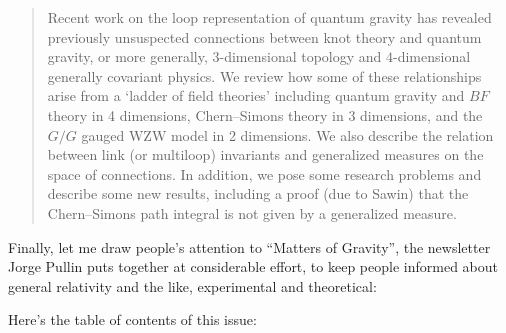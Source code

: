 \documentclass[12pt]{article}
\def\tightlist{}
\renewcommand{\texttt}[1]{%
  \begingroup
  \ttfamily
  \begingroup\lccode`~=`/\lowercase{\endgroup\def~}{/\discretionary{}{}{}}%
  \begingroup\lccode`~=`[\lowercase{\endgroup\def~}{[\discretionary{}{}{}}%
  \begingroup\lccode`~=`.\lowercase{\endgroup\def~}{.\discretionary{}{}{}}%
  \catcode`/=\active\catcode`[=\active\catcode`.=\active
  \scantokens{#1\noexpand}%
  \endgroup
}
\begin{document}
\begin{quote}
Recent work on the loop representation of quantum gravity has revealed
previously unsuspected connections between knot theory and quantum
gravity, or more generally, \(3\)-dimensional topology and
\(4\)-dimensional generally covariant physics. We review how some of
these relationships arise from a `ladder of field theories' including
quantum gravity and \(BF\) theory in 4 dimensions, Chern--Simons theory
in 3 dimensions, and the \(G/G\) gauged WZW model in 2 dimensions. We
also describe the relation between link (or multiloop) invariants and
generalized measures on the space of connections. In addition, we pose
some research problems and describe some new results, including a proof
(due to Sawin) that the Chern--Simons path integral is not given by a
generalized measure.
\end{quote}

Finally, let me draw people's attention to ``Matters of Gravity'', the
newsletter Jorge Pullin puts together at considerable effort, to keep
people informed about general relativity and the like, experimental and
theoretical:


Here's the table of contents of this issue:
\end{document}
